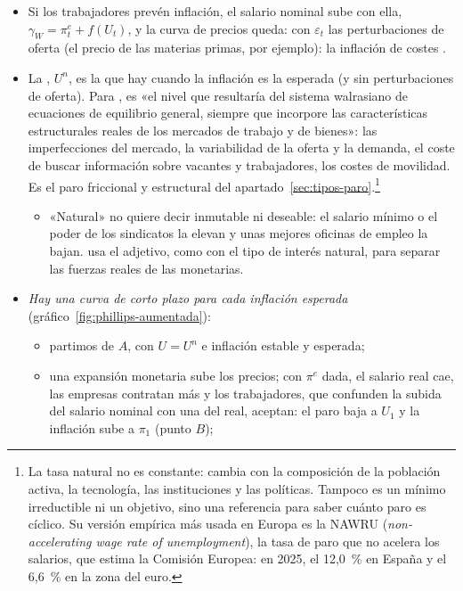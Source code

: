 \documentclass[11pt]{article}
\begin{document}
\begin{itemize}
\item Si los trabajadores prevén inflación, el salario nominal sube con ella, $\gamma_W=\pi^e_t+f(U_t)$, y la curva de precios queda:
  con $\varepsilon_t$ las perturbaciones de oferta (el precio de las materias primas, por ejemplo): la inflación de costes .
\item La , $U^n$, es la que hay cuando la inflación es la esperada (y sin perturbaciones de oferta). Para , es «el nivel que resultaría del sistema walrasiano de ecuaciones de equilibrio general, siempre que incorpore las características estructurales reales de los mercados de trabajo y de bienes»\nocite{Friedman1968Role}: las imperfecciones del mercado, la variabilidad de la oferta y la demanda, el coste de buscar información sobre vacantes y trabajadores, los costes de movilidad. Es el paro friccional y estructural del apartado~\ref{sec:tipos-paro}.\footnote{La tasa natural no es constante: cambia con la composición de la población activa, la tecnología, las instituciones y las políticas. Tampoco es un mínimo irreductible ni un objetivo, sino una referencia para saber cuánto paro es cíclico. Su versión empírica más usada en Europa es la NAWRU (\emph{non-accelerating wage rate of unemployment}), la tasa de paro que no acelera los salarios, que estima la Comisión Europea: en 2025, el 12,0~\% en España y el 6,6~\% en la zona del euro\nocite{CE2026AMECO}.}
  \begin{itemize}
  \item «Natural» no quiere decir inmutable ni deseable: el salario mínimo o el poder de los sindicatos la elevan y unas mejores oficinas de empleo la bajan.  usa el adjetivo, como  con el tipo de interés natural, para separar las fuerzas reales de las monetarias.
  \end{itemize}
\item \emph{Hay una curva de corto plazo para cada inflación esperada} (gráfico~\ref{fig:phillips-aumentada}):
  \begin{itemize}
  \item partimos de $A$, con $U=U^n$ e inflación estable y esperada;
  \item una expansión monetaria sube los precios; con $\pi^e$ dada, el salario real cae, las empresas contratan más y los trabajadores, que confunden la subida del salario nominal con una del real, aceptan: el paro baja a $U_1$ y la inflación sube a $\pi_1$ (punto $B$);

\end{itemize}
\end{itemize}
\end{document}
